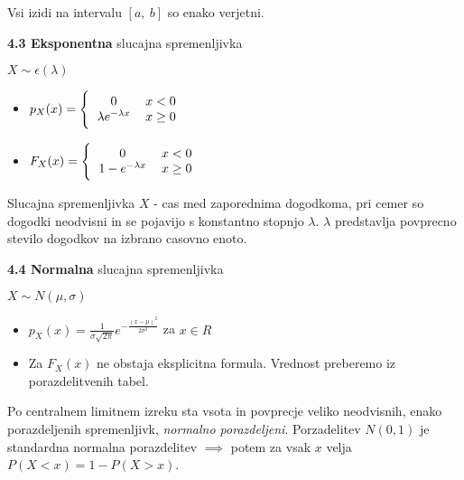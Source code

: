 \documentclass{article}
\begin{document}
\begin{multicols}{2}
Vsi izidi na intervalu $[a,\: b]$ so enako verjetni.

\textbf{4.3 Eksponentna} slucajna spremenljivka
\begin{center}
    \begin{math}
        X \sim \epsilon(\lambda)
    \end{math}
\end{center}

\begin{itemize}
    \item  \begin{math}
        p_{X}(x) =
        \Bigg \{\begin{tabular}{ccc}
          $0$  & $x < 0$ & \\
          $\lambda e^{- \lambda x}$ & $x \geq 0$ & \\
        \end{tabular}
    \end{math} 
    
     \item \begin{math}
        F_{X}(x) =
        \Bigg \{\begin{tabular}{ccc}
          $0$ & $x < 0$ & \\
          $1 - e^{- \lambda x}$ & $x \geq 0$  & \\
        \end{tabular}
    \end{math}
\end{itemize}

Slucajna spremenljivka $X$ - cas med zaporednima dogodkoma,
pri cemer so dogodki neodvisni in se pojavijo s konstantno
stopnjo $\lambda$. $\lambda$ predstavlja povprecno stevilo dogodkov
na izbrano casovno enoto.

\textbf{4.4 Normalna} slucajna spremenljivka
\begin{center}
    \begin{math}
        X \sim N(\mu, \sigma )
    \end{math}
\end{center}

\begin{itemize}
    \item  \begin{math}
        p_{X}(x) = \frac{1}{\sigma \sqrt{2 \pi}} e^{- \frac{(x - \mu)^{2}}{2 \sigma^{2}}}
    \end{math} za $x \in R$ 
    
     \item Za $F_{X}(x)$ ne obstaja eksplicitna formula. Vrednost preberemo iz porazdelitvenih tabel.
\end{itemize}
Po centralnem limitnem izreku sta vsota in povprecje veliko neodvisnih, enako porazdeljenih
spremenljivk, \textit{normalno porazdeljeni}.
Porzadelitev $N(0, 1)$ je standardna normalna porazdelitev $\implies$ potem za vsak $x$ velja
\begin{math}
    P(X < x) = 1 - P(X > x)
\end{math}.


\end{multicols}
\end{document}
